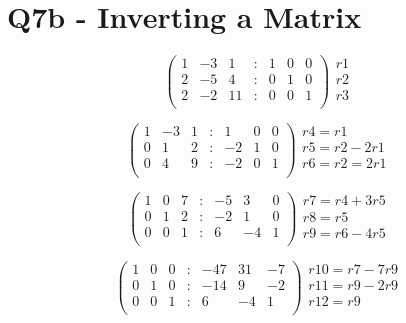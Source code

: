 \documentclass[12pt, a4paper]{report}
\theoremstyle{plain}
\theoremstyle{definition}
\theoremstyle{remark}
\begin{document}
{{\section*{Q7b - Inverting a Matrix}
\[\left(\begin{array}{ccccccc}
1	&	-3	&	1	&	:	&	1	&	0	&	0	\\
2	&	-5	&	4	&	:	&	0	&	1	&	0	\\
2	&	-2	&	11	&	:	&	0	&	0	&	1	\\
\end{array}\right)
	\begin{array}{c}
  r1	\\
			r2	\\
			r3	\\
 \end{array}\]
																

\[\left(\begin{array}{ccccccc}
1	&	-3	&	1	&	:	&	1	&	0	&	0	\\
0	&	1	&	2	&	:	&	-2	&	1	&	0	\\
0	&	4	&	9	&	:	&	-2	&	0	&	1	\\
\end{array}\right)
	\begin{array}{c}
r4=r1	\\
r5=r2-2r1	\\
r6=r2=2r1	\\
 \end{array}\]		
	
\[\left(\begin{array}{ccccccc}
1	&	0	&	7	&	:	&	-5	&	3	&	0	\\
0	&	1	&	2	&	:	&	-2	&	1	&	0	\\
0	&	0	&	1	&	:	&	6	&	-4	&	1	\\
\end{array}\right)
\begin{array}{c}
r7=r4+3r5	\\
r8=r5	\\
r9=r6-4r5	\\
\end{array}\]	
																
\[\left(\begin{array}{ccccccc}
1	&	0	&	0	&	:	&	-47	&	31	&	-7	\\
0	&	1	&	0	&	:	&	-14	&	9	&	-2	\\
0	&	0	&	1	&	:	&	6	&	-4	&	1	\\
\end{array}\right)
\begin{array}{c}
r10=r7-7r9	\\
r11=r9-2r9	\\
r12=r9	\\
\end{array}\]	
																	
}}
\end{document}
